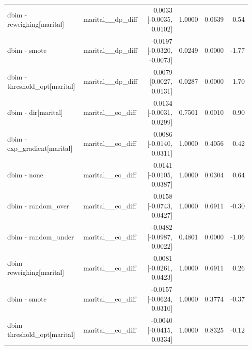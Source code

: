 \begin{table}[t]
{\begin{tabular}{llrrrr}
dbim - reweighing[marital] & marital\_\_dp\_diff & 0.0033 [-0.0035, 0.0102] & 1.0000 & 0.0639 & 0.54 \\
dbim - smote & marital\_\_dp\_diff & -0.0197 [-0.0320, -0.0073] & 0.0249 & 0.0000 & -1.77 \\
dbim - threshold\_opt[marital] & marital\_\_dp\_diff & 0.0079 [0.0027, 0.0131] & 0.0287 & 0.0000 & 1.70 \\
dbim - dir[marital] & marital\_\_eo\_diff & 0.0134 [-0.0031, 0.0299] & 0.7501 & 0.0010 & 0.90 \\
dbim - exp\_gradient[marital] & marital\_\_eo\_diff & 0.0086 [-0.0140, 0.0311] & 1.0000 & 0.4056 & 0.42 \\
dbim - none & marital\_\_eo\_diff & 0.0141 [-0.0105, 0.0387] & 1.0000 & 0.0304 & 0.64 \\
dbim - random\_over & marital\_\_eo\_diff & -0.0158 [-0.0743, 0.0427] & 1.0000 & 0.6911 & -0.30 \\
dbim - random\_under & marital\_\_eo\_diff & -0.0482 [-0.0987, 0.0022] & 0.4801 & 0.0000 & -1.06 \\
dbim - reweighing[marital] & marital\_\_eo\_diff & 0.0081 [-0.0261, 0.0423] & 1.0000 & 0.6911 & 0.26 \\
dbim - smote & marital\_\_eo\_diff & -0.0157 [-0.0624, 0.0310] & 1.0000 & 0.3774 & -0.37 \\
dbim - threshold\_opt[marital] & marital\_\_eo\_diff & -0.0040 [-0.0415, 0.0334] & 1.0000 & 0.8325 & -0.12 \\
\bottomrule
\end{tabular}}
\end{table}
